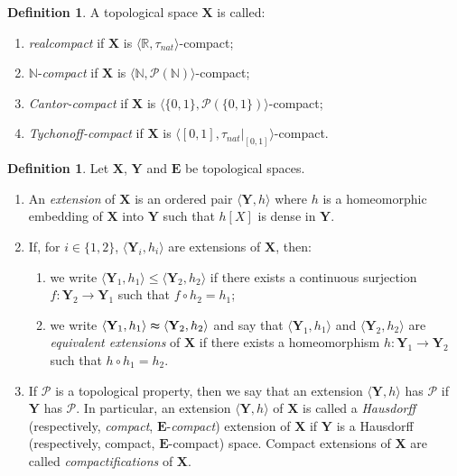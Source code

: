 \documentclass[12pt,twoside,leqno]{article}
\theoremstyle{plain}
\theoremstyle{definition}
\newtheorem{definition}[theorem]{Definition}
\theoremstyle{remark}
\begin{document}
\begin{definition}
	\label{s1:d2}
	A topological space $\mathbf{X}$ is called:
	\begin{enumerate}
		\item[(i)] \emph{realcompact} if $\mathbf{X}$ is $\langle \mathbb{R}, \tau_{nat}\rangle$-compact;
		\item[(ii)] $\mathbb{N}$-\emph{compact} if $\mathbf{X}$ is $\langle \mathbb{N}, \mathcal{P}(\mathbb{N})\rangle$-compact;
		\item[(iii)] \emph{Cantor-compact} if $\mathbf{X}$ is $\langle \{0, 1\}, \mathcal{P}(\{0, 1\})\rangle$-compact;
		\item[(iv)] \emph{Tychonoff-compact} if $\mathbf{X}$ is $\langle [0, 1], \tau_{nat}|_{[0, 1]}\rangle$-compact.
	\end{enumerate}
\end{definition}

\begin{definition}
	\label{s1:d3}
	Let $\mathbf{X}$, $\mathbf{Y}$ and $\mathbf{E}$ be  topological spaces.
	\begin{enumerate}
		\item[(a)] An \emph{extension} of $\mathbf{X}$ is an ordered pair $\langle\mathbf{Y}, h\rangle$ where  $h$ is a homeomorphic embedding of $\mathbf{X}$ into $\mathbf{Y}$ such that $h[X]$ is dense in $\mathbf{Y}$.
		\item[(b)] If, for $i\in\{1,2\}$,  $\langle\mathbf{Y}_i, h_i\rangle$ are extensions of $\mathbf{X}$, then:
		\begin{enumerate}
			\item[(i)] we write $\langle \mathbf{Y}_1, h_1\rangle\leq \langle \mathbf{Y}_2, h_2\rangle$ if there exists a continuous surjection $f: \mathbf{Y}_2\to \mathbf{Y}_1$ such that $f\circ h_2=h_1$;
			\item[(ii)] we write $\langle \mathbf{Y}_1, h_1\rangle\thickapprox\langle\mathbf{Y}_2, h_2\rangle$ and say that $\langle \mathbf{Y}_1, h_1\rangle$ and $\langle\mathbf{Y}_2, h_2\rangle$ are \emph{equivalent extensions} of $\mathbf{X}$ if there exists a homeomorphism $h: \mathbf{Y}_1\to\mathbf{Y}_2$ such that $h\circ h_1=h_2$.
		\end{enumerate}
		\item[(c)] If $\mathcal{P}$ is a topological property, then we say that an extension $\langle\mathbf{Y}, h\rangle$ has $\mathcal{P}$ if $\mathbf{Y}$ has $\mathcal{P}$. In particular, an extension $\langle \mathbf{Y}, h\rangle$ of $\mathbf{X}$ is called a \emph{Hausdorff} (respectively, \emph{compact}, $\mathbf{E}$-\emph{compact}) extension of $\mathbf{X}$ if $\mathbf{Y}$ is a Hausdorff (respectively, compact, $\mathbf{E}$-compact) space. Compact extensions of $\mathbf{X}$ are called \emph{compactifications} of $\mathbf{X}$.
	\end{enumerate}
\end{definition}
\end{document}
